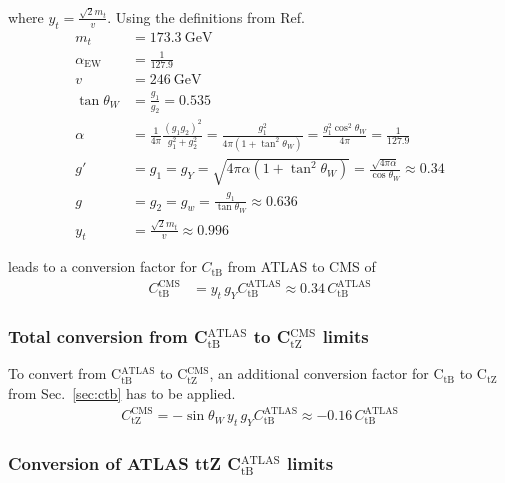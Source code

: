 \documentclass[letterpaper,11pt]{article}
\begin{document}
\noindent
where $y_t=\frac{\sqrt{2}m_t}{v}$. Using the definitions from Ref.~\cite{Bylund:2016phk}
\begin{align*}
	m_t &= 173.3~\text{GeV}\\
	\alpha_\text{EW} &= \frac{1}{127.9}\\
	v &= 246~\text{GeV}\\
	\tan\theta_W &= \frac{g_1}{g_2} = 0.535\\
	\alpha &= \frac{1}{4\pi}\frac{(g_1g_2)^2}{g_1^2+g_2^2} = \frac{g_1^2}{4\pi(1+\tan^2\theta_W)} = \frac{g_1^2\cos^2\theta_W}{4\pi} = \frac{1}{127.9}\\
	g' &= g_1 = g_Y = \sqrt{4\pi\alpha(1+\tan^2\theta_W)} = \frac{\sqrt{4\pi\alpha}}{\cos\theta_W} \approx 0.34\\
	g &= g_2 = g_w = \frac{g_1}{\tan\theta_W} \approx 0.636\\
	y_t &= \frac{\sqrt{2}m_t}{v} \approx 0.996
\end{align*}

\noindent
leads to a conversion factor for $C_\text{tB}$ from ATLAS to CMS of
\begin{align}
C_\text{tB}^\text{CMS} &= y_t\,g_Y C_\text{tB}^\text{ATLAS} \approx 0.34 \, C_\text{tB}^\text{ATLAS}
\end{align}

\noindent
{}

\subsubsection{Total conversion from C$_\text{tB}^\text{ATLAS}$ to C$_\text{tZ}^\text{CMS}$ limits}

To convert from C$_\text{tB}^\text{ATLAS}$ to C$_\text{tZ}^\text{CMS}$, an additional conversion factor for C$_\text{tB}$ to C$_\text{tZ}$ from Sec.~\ref{sec:ctb} has to be applied.
\begin{align}
	C_\text{tZ}^\text{CMS} = -\sin\theta_{W}\,y_t\,g_Y C_\text{tB}^\text{ATLAS} \approx -0.16\,C_\text{tB}^\text{ATLAS}
\end{align}

\noindent
{}

\subsubsection{Conversion of ATLAS ttZ C$_\text{tB}^\text{ATLAS}$ limits}
\end{document}
